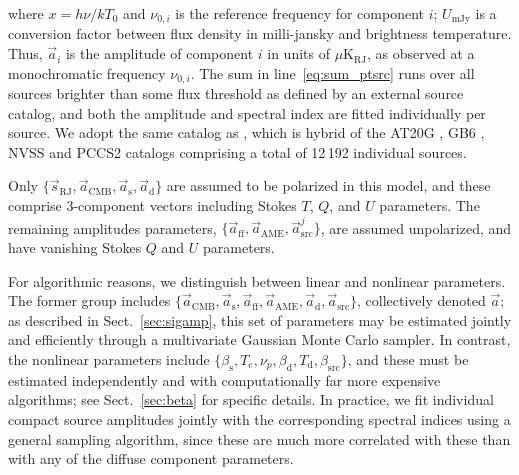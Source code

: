 \documentclass[twocolumn]{aa}
\renewcommand{\d}[0]{\vec{d}}
\newcommand{\s}[0]{\vec{s}}
\renewcommand{\a}[0]{\vec{a}}
\newcommand{\N}[0]{\tens{N}}
\begin{document}
where $x=h\nu/kT_0$ and $\nu_{0,i}$ is the reference frequency for
component $i$; $U_{\mathrm{mJy}}$ is a conversion factor between flux
density in milli-jansky and brightness temperature. Thus, $\a_i$ is
the amplitude of component $i$ in units of
$\mu\mathrm{K}_{\mathrm{RJ}}$, as observed at a monochromatic
frequency $\nu_{0,i}$.
The sum in line~\ref{eq:sum_ptsrc} runs over all sources brighter than
some flux threshold as defined by an external source catalog, and both
the amplitude and spectral index are fitted individually per
source. We adopt the same catalog as \citet{planck2016-l04}, which is
hybrid of the AT20G \citep{murphy2010}, GB6 \citep{gregory1996}, NVSS
\citep{condon1998} and PCCS2 \citep{planck2014-a35} catalogs
comprising a total of 12\,192 individual sources.


Only $\{\s_{\mathrm{RJ}}, \a_{\mathrm{CMB}}, \a_{\mathrm{s}},
\a_{\mathrm{d}}\}$ are assumed to be polarized in this model, and these
comprise 3-component vectors including Stokes $T$, $Q$, and $U$
parameters. The remaining amplitudes parameters, $\{\a_{\mathrm{ff}},
\a_{\mathrm{AME}}, \a^j_{\mathrm{src}}\}$, are assumed unpolarized, and have vanishing
Stokes $Q$ and $U$ parameters.

For algorithmic reasons, we distinguish between linear and nonlinear
parameters. The former group includes $\{\a_{\mathrm{CMB}},
\a_{\mathrm{s}}, \a_{\mathrm{ff}}, \a_{\mathrm{AME}}, \a_{\mathrm{d}},
\a_{\mathrm{src}}\}$, collectively denoted $\a$; as
described in Sect.~\ref{sec:sigamp}, this set of parameters may be
estimated jointly and efficiently through a multivariate Gaussian
Monte Carlo sampler. In contrast, the nonlinear parameters include
$\{\beta_{\mathrm{s}}, T_e, \nu_{p}, \beta_{\mathrm{d}},
T_{\mathrm{d}}, \beta_{\mathrm{src}}\}$, and these must be estimated
independently and with computationally far more expensive algorithms;
see Sect.~\ref{sec:beta} for specific details. In practice, we fit
individual compact source amplitudes jointly with the corresponding
spectral indices using a general sampling algorithm, since these are
much more correlated with these than with any of the diffuse component
parameters. 
\end{document}
